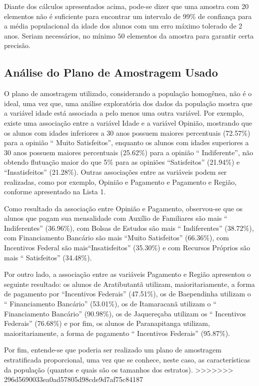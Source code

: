 	Diante dos cálculos apresentados acima, pode-se dizer que uma amostra
	com 20 elementos não é suficiente para encontrar um intervalo de 99\% de
	confiança para a média populacional da idade dos alunos com um erro
	máximo tolerado de 2 anos. Seriam necessários, no mínimo $50$ elementos da
	amostra para garantir certa precisão. 

\subsection{Análise do Plano de Amostragem Usado}
	
	
	O plano de amostragem utilizado, considerando a população homogênea, não é o ideal, 
	uma vez que, uma análise exploratória dos dados da população mostra que a variável idade está associada 
	a pelo menos uma outra variável. Por exemplo, existe uma
	associação entre a variável Idade e a variável Opinião, mostrando que os
	alunos com idades inferiores a 30 anos possuem maiores percentuais
	(\num{72,57}\%) para a opinião `` Muito Satisfeitos'', enquanto os 
    alunos com idades superiores
	a 30 anos possuem maiores percentuais (\num{25,62}\%) para a opinião
    `` Indiferente'', não obtendo flutuação
	maior do que 5\% para as opiniões ``Satisfeitos'' (\num{21,94}\%) 
    e ``Insatisfeitos'' (\num{21,28}\%). Outras associações entre as variáveis podem ser realizadas, como por exemplo, 
       Opinião e Pagamento e Pagamento e Região, conforme apresentado na Lista 1. 

	Como resultado da associação entre Opinião e Pagamento, observou-se que
	os alunos que pagam sua mensalidade com Auxílio de Familiares são mais
	`` Indiferentes'' (\num{36,96}\%), com Bolsas
	de Estudos são mais `` Indiferentes''
	(\num{38,72}\%), com Financiamento Bancário são mais ``Muito Satisfeitos''
    (\num{66,36}\%), com Incentivos Federal são mais``Insatisfeitos'' (\num{35,30}\%) e com
	Recursos Próprios são mais ``
	Satisfeitos'' (\num{34,48}\%).

	Por outro lado, a associação entre as variáveis Pagamento e Região
	apresentou o seguinte resultado: os alunos de Aratibutantã utilizam,
	maioritariamente, a forma de pagamento por ``Incentivos Federais''
    (\num{47,51}\%), os de Baependinha utilizam o
	`` Financiamento Bancário'' (\num{53,01}\%), os
	de Itamaracanã utilizam o `` Financiamento Bancário'' 
    (\num{90,98}\%), os de Jaquereçaba utilizam os
	`` Incentivos Federais'' (\num{76,68}\%) e por
	fim, os alunos de Paranapitanga utilizam, maioritariamente, a forma de
	pagamento `` Incentivos Federais'' (\num{95,87}\%). 

	Por fim, entende-se que poderia ser realizado um plano de amostragem estratificada 
	proporcional, uma vez que se conhece, neste caso, as características da população 
	(quantos e quais são os tamanhos dos estratos). 
>>>>>>> 296d5690033ea0ad57805d98cde9d7af75c84187
